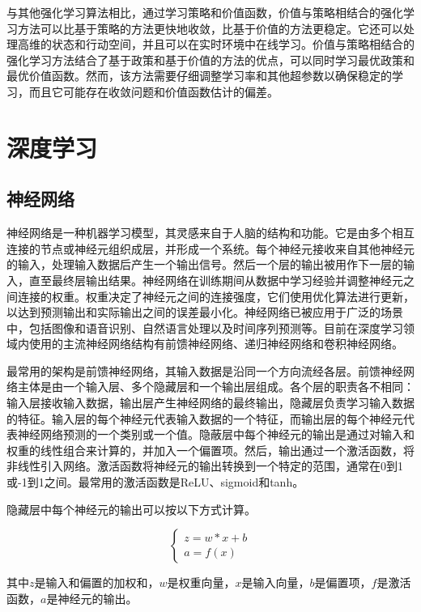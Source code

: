 与其他强化学习算法相比，通过学习策略和价值函数，价值与策略相结合的强化学习方法可以比基于策略的方法更快地收敛，比基于价值的方法更稳定。它还可以处理高维的状态和行动空间，并且可以在实时环境中在线学习。价值与策略相结合的强化学习方法结合了基于政策和基于价值的方法的优点，可以同时学习最优政策和最优价值函数。然而，该方法需要仔细调整学习率和其他超参数以确保稳定的学习，而且它可能存在收敛问题和价值函数估计的偏差。


\section{深度学习}

\subsection{神经网络}

神经网络是一种机器学习模型，其灵感来自于人脑的结构和功能。它是由多个相互连接的节点或神经元组织成层，并形成一个系统。每个神经元接收来自其他神经元的输入，处理输入数据后产生一个输出信号。然后一个层的输出被用作下一层的输入，直至最终层输出结果。神经网络在训练期间从数据中学习经验并调整神经元之间连接的权重。权重决定了神经元之间的连接强度，它们使用优化算法进行更新，以达到预测输出和实际输出之间的误差最小化。神经网络已被应用于广泛的场景中，包括图像和语音识别、自然语言处理以及时间序列预测等。目前在深度学习领域内使用的主流神经网络结构有前馈神经网络、递归神经网络和卷积神经网络。

最常用的架构是前馈神经网络，其输入数据是沿同一个方向流经各层。前馈神经网络主体是由一个输入层、多个隐藏层和一个输出层组成。各个层的职责各不相同：输入层接收输入数据，输出层产生神经网络的最终输出，隐藏层负责学习输入数据的特征。输入层的每个神经元代表输入数据的一个特征，而输出层的每个神经元代表神经网络预测的一个类别或一个值。隐蔽层中每个神经元的输出是通过对输入和权重的线性组合来计算的，并加入一个偏置项。然后，输出通过一个激活函数，将非线性引入网络。激活函数将神经元的输出转换到一个特定的范围，通常在0到1或-1到1之间。最常用的激活函数是ReLU、sigmoid和tanh。

隐藏层中每个神经元的输出可以按以下方式计算。

\begin{equation}
\label{eq:2_13}
\left\{\begin{array}{c}
z = w * x + b \\
a = f(x)
\end{array}\right.
\end{equation}

其中$z$是输入和偏置的加权和，$w$是权重向量，$x$是输入向量，$b$是偏置项，$f$是激活函数，$a$是神经元的输出。

